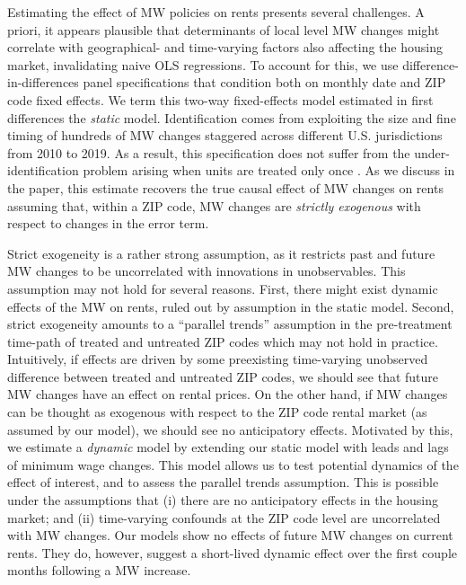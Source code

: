 Estimating the effect of MW policies on rents presents several challenges. A priori, it appears 
plausible that determinants of local level MW changes might correlate with geographical- and 
time-varying factors also affecting the housing market, invalidating naive OLS regressions. To 
account for this, we use difference-in-differences panel specifications that condition both on 
monthly date and ZIP code fixed effects. We term this two-way fixed-effects model estimated in 
first differences the \textit{static} model. Identification comes from exploiting the size and 
fine timing of hundreds of MW changes staggered across different U.S. jurisdictions from 2010 
to 2019. As a result, this specification does not suffer from the under-identification problem 
arising when units are treated only once \parencite{BorusyakJaravel2017}. As we discuss in the 
paper, this estimate recovers the true causal effect of MW changes on rents assuming that, within 
a ZIP code, MW changes are \textit{strictly exogenous} with respect to changes in the error term. 

Strict exogeneity is a rather strong assumption, as it restricts past and future MW changes to 
be uncorrelated with innovations in unobservables. This assumption may not hold for several 
reasons. First, there might exist dynamic effects of the MW on rents, ruled out by assumption 
in the static model. Second, strict exogeneity amounts to a ``parallel trends'' assumption in 
the pre-treatment time-path of treated and untreated ZIP codes which may not hold in practice. Intuitively, if effects are driven by some preexisting time-varying unobserved difference 
between treated and untreated ZIP codes, we should see that future MW changes have an effect on 
rental prices. On the other hand, if MW changes can be thought as exogenous with respect to the 
ZIP code rental market (as assumed by our model), we should see no anticipatory effects. 
Motivated by this, we estimate a \textit{dynamic} model by extending our static model with leads 
and lags of minimum wage changes. This model allows us to test potential dynamics of the effect 
of interest, and to assess the parallel trends assumption. This is possible under the 
assumptions that (i) there are no anticipatory effects in the housing market; and (ii) 
time-varying confounds at the ZIP code level are uncorrelated with MW changes. Our models show 
no effects of future MW changes on current rents. They do, however, suggest a short-lived 
dynamic effect over the first couple months following a MW increase.

